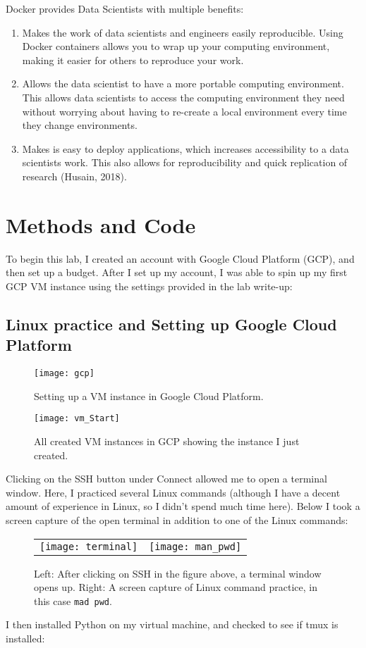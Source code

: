 \documentclass[]{article}
\newcommand{\code}[1]{\colorbox{light-gray}{\texttt{#1}}}
\begin{document}
\begin{enumerate}
Docker provides Data Scientists with multiple benefits:
\begin{enumerate}
\item Makes the work of data scientists and engineers easily reproducible.  Using Docker containers allows you to wrap up your computing environment, making it easier for others to reproduce your work.
\item Allows the data scientist to have a more portable computing environment.  This allows data scientists to access the computing environment they need without worrying about having to re-create a local environment every time they change environments.  
\item Makes is easy to deploy applications, which increases accessibility to a data scientists work.  This also allows for reproducibility and quick replication of research (Husain, 2018).
\end{enumerate}

\end{enumerate}	
\section{Methods and Code}

To begin this lab, I created an account with Google Cloud Platform (GCP), and then set up a budget.  After I set up my account, I was able to spin up my first GCP VM instance using the settings provided in the lab write-up:
\pagebreak
\subsection{Linux practice and Setting up Google Cloud Platform}
\begin{figure}[!h]
	\texttt{[image: gcp]}
	\caption{Setting up a VM instance in Google Cloud Platform.}
	\label{Fig:Race}
\end{figure}
\begin{figure}[!h]
	\texttt{[image: vm\_Start]}
	\caption{All created VM instances in GCP showing the instance I just created.}
	\label{Fig:Race}
\end{figure}

Clicking on the SSH button under Connect allowed me to open a terminal window.  Here, I practiced several Linux commands (although I have a decent amount of experience in Linux, so I didn't spend much time here).  Below I took a screen capture of the open terminal in addition to one of the Linux commands:
\pagebreak
\begin{figure}[!h]
	\begin{tabular}{ll}
		\texttt{[image: terminal]}
		&
		\texttt{[image: man\_pwd]}
	\end{tabular}
	\caption{Left: After clicking on SSH in the figure above, a terminal window opens up.  Right: A screen capture of Linux command practice, in this case \code{mad pwd}.}
	\label{Fig:Race}
\end{figure}
I then installed Python on my virtual machine, and checked to see if tmux is installed:
\end{document}
